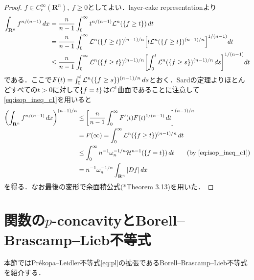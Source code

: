 \documentclass[a4j]{ltjsarticle}
\newcommand{\Rset}{\mathbf{R}}
\newcommand{\Lm}{\mathcal{L}}
\newcommand{\Hm}{\mathcal{H}}
\newcommand{\1}{\bm{1}}
\numberwithin{equation}{section}
\theoremstyle{definition}
\begin{document}
\begin{proof}
    $f\in C^\infty_c(\Rset^n),\ f\geq0$としてよい．layer-cake representationより
    \begin{align}
        \int_{\Rset^n}f^{n/(n-1)}\,dx&=\frac{n}{n-1}\int_{0}^{\infty}t^{n/(n-1)}\Lm^n(\qty{f\geq t})\,dt\\
        &=\frac{n}{n-1}\int_{0}^{\infty}\Lm^n(\qty{f\geq t})^{(n-1)/n}\qty[t\Lm^n(\qty{f\geq t})^{(n-1)/n}]^{1/(n-1)}dt\\
        &\leq \frac{n}{n-1}\int_{0}^{\infty}\Lm^n(\qty{f\geq t})^{(n-1)/n}\qty[\int_{0}^{t}\Lm^n(\qty{f\geq s})^{(n-1)/n}\,ds]^{1/(n-1)}dt
    \end{align}
    である．ここで$F(t)=\int_{0}^{t}\Lm^n(\qty{f\geq s})^{(n-1)/n}\,ds$とおく．Sardの定理よりほとんどすべての$t>0$に対して$\qty{f=t}$は$C^1$曲面であることに注意して\eqref{eq:isop_ineq_c1}を用いると
    \begin{align}
        \qty(\int_{\Rset^n}f^{n/(n-1)}\,dx)^{(n-1)/n}&\leq \qty[\frac{n}{n-1}\int_{0}^{\infty}F'(t)F(t)^{1/(n-1)}\,dt]^{(n-1)/n}\\
        &=F(\infty)=\int_{0}^{\infty}\Lm^n(\qty{f\geq t})^{(n-1)/n}\,dt\\
        &\leq \int_{0}^{\infty}n^{-1}\omega_n^{-1/n}\Hm^{n-1}(\qty{f=t})\,dt\quad\quad (\text{by \eqref{eq:isop_ineq_c1}})\\
        &=n^{-1}\omega_n^{-1/n}\int_{\Rset^n}\abs{Df}\,dx 
    \end{align}
    を得る．なお最後の変形で余面積公式(\cite{EG}*{Theorem 3.13})を用いた．
\end{proof}

\section{関数の\texorpdfstring{$p$}{TEXT}-concavityとBorell--Brascamp--Lieb不等式}
本節ではPr\'ekopa--Leidler不等式\eqref{eq:pl}の拡張であるBorell--Brascamp--Lieb不等式を紹介する．
\end{document}

